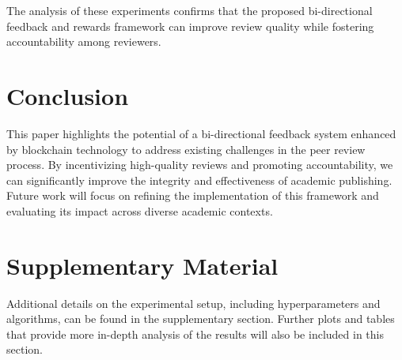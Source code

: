 \documentclass{article} %
\theoremstyle{plain}
\theoremstyle{definition}
\theoremstyle{remark}
\begin{document}
The analysis of these experiments confirms that the proposed bi-directional feedback and rewards framework can improve review quality while fostering accountability among reviewers. 

\section{Conclusion}
This paper highlights the potential of a bi-directional feedback system enhanced by blockchain technology to address existing challenges in the peer review process. By incentivizing high-quality reviews and promoting accountability, we can significantly improve the integrity and effectiveness of academic publishing. Future work will focus on refining the implementation of this framework and evaluating its impact across diverse academic contexts.




\appendix

\section*{\LARGE Supplementary Material}
\label{sec:appendix}

Additional details on the experimental setup, including hyperparameters and algorithms, can be found in the supplementary section. Further plots and tables that provide more in-depth analysis of the results will also be included in this section.
\end{document}
